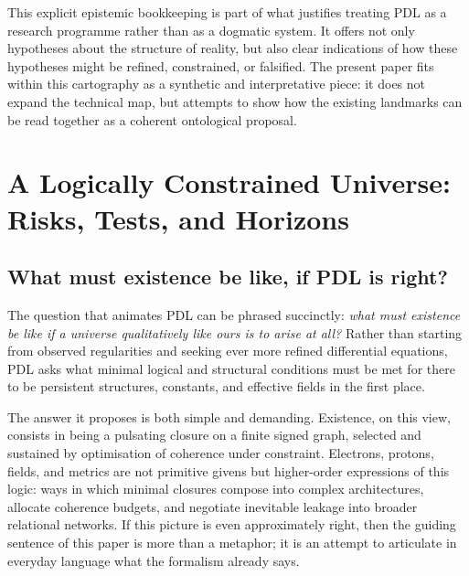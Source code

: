 \documentclass[11pt,a4paper]{article}
\theoremstyle{definition}
\begin{document}
This explicit epistemic bookkeeping is part of what justifies treating PDL as a research programme rather than as a dogmatic system. It offers not only hypotheses about the structure of reality, but also clear indications of how these hypotheses might be refined, constrained, or falsified.\cite{Laubscher_PDL_Position_2024,Laubscher_PDL_GlobalMapping_v6_2024} The present paper fits within this cartography as a synthetic and interpretative piece: it does not expand the technical map, but attempts to show how the existing landmarks can be read together as a coherent ontological proposal.

\section{A Logically Constrained Universe: Risks, Tests, and Horizons}
\label{sec:risks_tests}

\subsection{What must existence be like, if PDL is right?}

The question that animates PDL can be phrased succinctly: \emph{what must existence be like if a universe qualitatively like ours is to arise at all?} Rather than starting from observed regularities and seeking ever more refined differential equations, PDL asks what minimal logical and structural conditions must be met for there to be persistent structures, constants, and effective fields in the first place.\cite{Laubscher_EmergencePhysicalReality_2024,Laubscher_IntroPDL_2024,Laubscher_PDL_Position_2024}

The answer it proposes is both simple and demanding. Existence, on this view, consists in being a pulsating closure on a finite signed graph, selected and sustained by optimisation of coherence under constraint. Electrons, protons, fields, and metrics are not primitive givens but higher-order expressions of this logic: ways in which minimal closures compose into complex architectures, allocate coherence budgets, and negotiate inevitable leakage into broader relational networks.\cite{Laubscher_MinimalClosures_46_2024,Laubscher_ProtonArch_v2_2024,Laubscher_EffectiveFields_2024,Laubscher_UniversalCoherenceLeakage_2024} If this picture is even approximately right, then the guiding sentence of this paper is more than a metaphor; it is an attempt to articulate in everyday language what the formalism already says.
\end{document}
